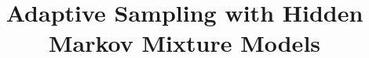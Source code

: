 \documentclass{article} %
\title{Adaptive Sampling with Hidden Markov Mixture Models}
\author{
  
}
\begin{document}
\maketitle

\begin{abstract}
  
\end{abstract}





\end{document}
